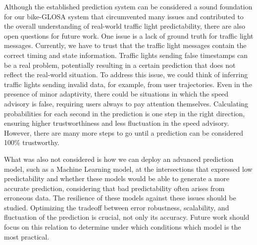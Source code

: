 Although the established prediction system can be considered a sound foundation for our bike-GLOSA system that circumvented many issues and contributed to the overall understanding of real-world traffic light predictability, there are also open questions for future work. One issue is a lack of ground truth for traffic light messages. Currently, we have to trust that the traffic light messages contain the correct timing and state information. Traffic lights sending false timestamps can be a real problem, potentially resulting in a certain prediction that does not reflect the real-world situation. To address this issue, we could think of inferring traffic lights sending invalid data, for example, from user trajectories. Even in the presence of minor adaptivity, there could be situations in which the speed advisory is false, requiring users always to pay attention themselves. Calculating probabilities for each second in the prediction is one step in the right direction, ensuring higher trustworthiness and less fluctuation in the speed advisory. However, there are many more steps to go until a prediction can be considered 100\% trustworthy.

What was also not considered is how we can deploy an advanced prediction model, such as a Machine Learning model, at the intersections that expressed low predictability and whether these models would be able to generate a more accurate prediction, considering that bad predictability often arises from erroneous data. The resilience of these models against these issues should be studied. Optimizing the tradeoff between error robustness, scalability, and fluctuation of the prediction is crucial, not only its accuracy. Future work should focus on this relation to determine under which conditions which model is the most practical.
